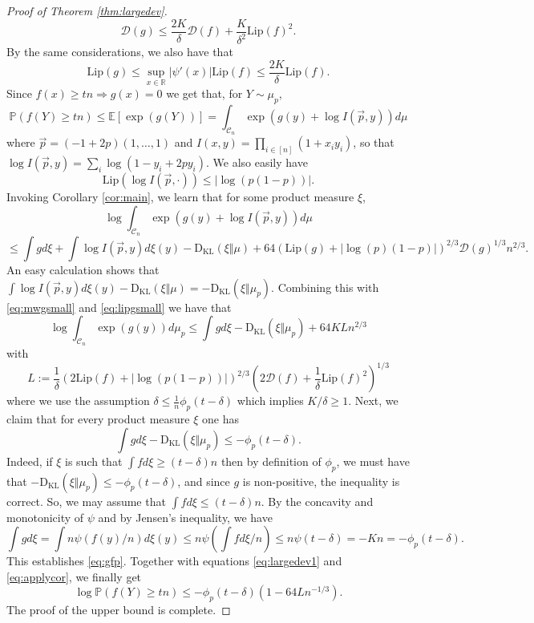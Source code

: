 \documentclass[12pt]{article}
\def \RR {\mathbb R}
\def \EE {\mathbb E}
\def \PP {\mathbb P}
\def \Lip {\mathrm {Lip}}
\def \DC {\mathcal{C}_n}
\def \KL {\mathrm{D}_{\mathrm{KL}}}
\def \Comp { \mathcal{D} }
\theoremstyle{definition}
\theoremstyle{remark}
\begin{document}
\begin{proof} [Proof of Theorem \ref{thm:largedev}]
	\begin{equation}\label{eq:mwgsmall}
	\Comp(g) \leq \frac{2K}{\delta} \Comp(f) + \frac{K}{\delta^2} \Lip(f)^2.
	\end{equation}
	By the same considerations, we also have that
	\begin{equation}\label{eq:lipgsmall}
	\Lip(g) \leq \sup_{x \in \RR} |\psi'(x)| \Lip(f) \leq \frac{2K}{\delta} \Lip(f).
	\end{equation}
	Since $f(x) \geq tn \Rightarrow g(x)=0$ we get that, for $Y \sim \mu_p$,
	\begin{equation}\label{eq:largedev1}
	\PP(f(Y) \geq tn) \leq \EE[\exp(g(Y))] = \int_{\DC} \exp(g(y) + \log I(\vec p,y)) d \mu
	\end{equation}
	where $\vec p = (-1+2p) (1,\dots,1)$ and $I(x,y) = \prod_{i \in [n]} (1 + x_i y_i)$, so that $\log I(\vec p, y) = \sum_i \log(1-y_i+2p y_i)$. We also easily have
	$$
	\Lip(\log I(\vec p, \cdot)) \leq |\log (p(1-p))|.
	$$
	Invoking Corollary \ref{cor:main}, we learn that for some product measure $\xi$,
	{\small
		\begin{equation}\label{eq:applycor}
		\log \int_{\DC} \exp(g(y) + \log I(\vec p,y)) d \mu
		\end{equation}
		$$
		\leq \int g d \xi + \int \log I(\vec p,y) d \xi(y) - \KL(\xi \Vert \mu) + 64 (\Lip(g) + |\log(p)(1-p)|)^{2/3} \Comp(g)^{1/3} n^{2/3}.
		$$
	}
	An easy calculation shows that $ \int \log I(\vec p,y) d \xi(y) - \KL(\xi \Vert \mu) = - \KL(\xi \Vert \mu_p)$. Combining this with \eqref{eq:mwgsmall} and \eqref{eq:lipgsmall} we have that
	\begin{equation}\label{key}
	\log \int_{\DC} \exp(g(y)) d \mu_p \leq \int g d \xi - \KL(\xi \Vert \mu_p) + 64 K L n^{2/3}
	\end{equation}
	with
	$$
	L := \frac{1}{\delta} \left ( 2 \Lip(f) + |\log(p(1-p))| \right )^{2/3} \left ( 2 \Comp(f) + \frac{1}{\delta} \Lip(f)^2 \right )^{1/3}
	$$
	where we use the assumption $\delta \leq \frac 1 n \phi_p(t-\delta)$ which implies $K/\delta \geq 1$. Next, we claim that for every product measure $\xi$ one has
	\begin{equation}\label{eq:gfp}
	\int g d \xi - \KL(\xi \Vert \mu_p) \leq - \phi_p(t-\delta).
	\end{equation}
	Indeed, if $\xi$ is such that $\int f d \xi \geq (t-\delta) n$ then by definition of $\phi_p$, we must have that $-\KL(\xi \Vert \mu_p) \leq -\phi_p(t-\delta)$, and since $g$ is non-positive, the inequality is correct. So, we may assume that $\int f d \xi \leq (t-\delta) n$. By the concavity and monotonicity of $\psi$ and by Jensen's inequality,
	we have
	$$
	\int g d \xi = \int n \psi(f(y)/n) d \xi(y) \leq  n \psi \left (\int f d \xi / n \right ) \leq n \psi \left ( t-\delta \right ) =-K n = -\phi_p(t-\delta).
	$$
	This establishes \eqref{eq:gfp}. Together with equations \eqref{eq:largedev1} and \eqref{eq:applycor}, we finally get
	$$
	\log \PP(f(Y) \geq tn) \leq - \phi_p(t-\delta) (1 - 64 L n^{-1/3}).
	$$
	The proof of the upper bound is complete. 


\end{proof}
\end{document}
